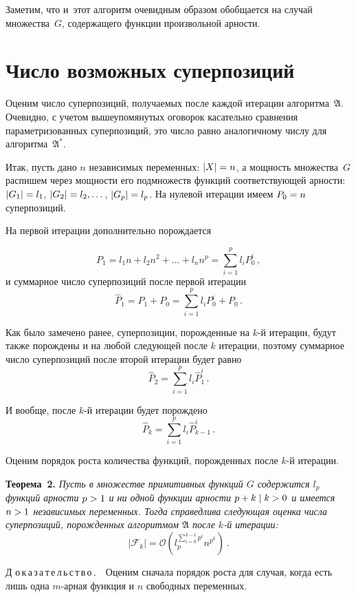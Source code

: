 \begin{multicols}{2}
Заметим, что и~этот алгоритм очевидным образом обобщается на случай
множества~$G$, содержащего функции произвольной арности.

\section{Число возможных суперпозиций}

Оценим число суперпозиций, получаемых после каждой итерации
алгоритма~$\mathfrak{A}$. Очевидно, с учетом вышеупомянутых оговорок
касательно сравнения параметризованных суперпозиций, это число равно
аналогичному числу для алгоритма~$\mathfrak{A^*}$.

Итак, пусть дано $n$ независимых переменных: $| X | \hm= n$, а мощность
множества~$G$ распишем через мощности его подмножеств функций соответствующей
арности: $| G_1 | \hm= l_1$, $| G_2 | \hm= l_2, \dots$, $| G_p | \hm= l_p$. На нулевой
итерации имеем $P_0 \hm= n$ суперпозиций.

На первой итерации дополнительно порож\-да\-ется

\noindent
$$
P_1 = l_1 n + l_2 n^2 + \dots + l_n n^p = \sum\limits_{i=1}^p l_i P_0^i\,,
$$
и суммарное число суперпозиций после первой итерации
$$
\hat{P}_1 = P_1 + P_0 = \sum\limits_{i=1}^p l_i P_0^i + P_0\,.
$$

Как было замечено ранее, суперпозиции, по\-рож\-ден\-ные на $k$-й итерации, будут
также порождены и на любой следующей после $k$ итерации, поэтому суммарное
число суперпозиций после второй итерации будет равно
$$
\hat{P}_2 = \sum\limits_{i=1}^p l_i \hat{P}_1^i\,.
$$

И вообще, после $k$-й итерации будет порождено
$$
\hat{P}_k = \sum\limits_{i=1}^p l_i \hat{P}_{k-1}^i\,.
$$

Оценим порядок роста количества функций, порожденных после $k$-й итерации.

\smallskip

\noindent
\textbf{Теорема~2.}
\textit{Пусть в множестве примитивных функций $G$ содержится $l_p$ функций арности
  $p \hm> 1$ и ни одной функции арности $p \hm+ k \mid k \hm> 0$ и имеется $n \hm> 1$
  независимых переменных. Тогда справедлива следующая оценка чис\-ла
  суперпозиций, порожденных алгоритмом $\mathfrak{A}$ после $k$-й итерации:}
  $$
  \left\vert \mathcal{F}_k \right\vert = \mathcal{O} 
  \left(l_p^{\sum_{i=0}^{k-1} p^i} n^{p^k}\right)\,.
  $$


\smallskip

\noindent
Д\,\,о\,к\,а\,з\,а\,т\,е\,л\,ь\,с\,т\,в\,о\,.\ \ 
  Оценим сначала порядок рос\-та для случая, когда есть лишь одна $m$-ар\-ная
  функция и $n$ свободных переменных.


\end{multicols}
